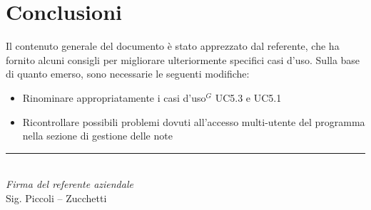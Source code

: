 \documentclass[a4paper,10pt]{article}
\begin{document}
\section*{Conclusioni}
Il contenuto generale del documento è stato apprezzato dal referente, che ha fornito alcuni consigli per migliorare ulteriormente specifici casi d’uso. Sulla base di quanto emerso, sono necessarie le seguenti modifiche:
\begin{itemize}
\item Rinominare appropriatamente i casi d'uso$^G$ UC5.3 e UC5.1
\item Ricontrollare possibili problemi dovuti all'accesso multi-utente del programma nella sezione di gestione delle note
\end{itemize}

\vspace{2cm}
\begin{flushright}
  \noindent\rule{6cm}{0.4pt}\\
  \textit{Firma del referente aziendale}\\
  Sig. Piccoli – Zucchetti
\end{flushright}
\end{document}
